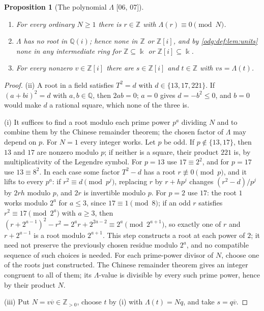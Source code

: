 \documentclass[11pt,oneside]{article}
\numberwithin{equation}{section}
\newtheorem{proposition}[proposition]{Proposition}
\theoremstyle{definition}
\theoremstyle{remark}
\newcommand{\Z}{\mathbb Z}
\newcommand{\Q}{\mathbb Q}
\newcommand{\src}[1]{\textup{\textsf{\small[#1]}}}
\begin{document}
\begin{proposition}[The polynomial $\Lambda$ \src{06, 07}]\label{odg:def:prop:intersective}
\leavevmode
\begin{enumerate}[label=\textup{(\roman*)},leftmargin=*]
\item For every ordinary $N\ge1$ there is $r\in\Z$ with
$\Lambda(r)\equiv0\pmod N$.
\item $\Lambda$ has no root in $\Q(i)$; hence none in $\Z$ or $\Z[i]$, and by
\cref{odg:def:lem:units} none in any intermediate ring for $\Z\subseteq\Bbbk$
or $\Z[i]\subseteq\Bbbk$.
\item For every nonzero $v\in\Z[i]$ there are $s\in\Z[i]$ and $t\in\Z$ with
$vs=\Lambda(t)$.
\end{enumerate}
\end{proposition}
\begin{proof}
(ii) A root in a field satisfies $T^2=d$ with $d\in\{13,17,221\}$. If
$(a+bi)^2=d$ with $a,b\in\Q$, then $2ab=0$; $a=0$ gives $d=-b^2\le0$, and
$b=0$ would make $d$ a rational square, which none of the three is.

(i) It suffices to find a root modulo each prime power $p^a$ dividing $N$
and to combine them by the Chinese remainder theorem; the chosen factor of
$\Lambda$ may depend on $p$. For $N=1$ every integer works. Let $p$ be odd. If $p\notin\{13,17\}$, then $13$
and $17$ are nonzero modulo $p$; if neither is a square, their product $221$
is, by multiplicativity of the Legendre symbol. For $p=13$ use
$17\equiv2^2$, and for $p=17$ use $13\equiv8^2$. In each case some factor
$T^2-d$ has a root $r\not\equiv0\pmod p$, and it lifts to every $p^a$: if
$r^2\equiv d\pmod{p^j}$, replacing $r$ by $r+hp^j$ changes $(r^2-d)/p^j$ by
$2rh$ modulo $p$, and $2r$ is invertible modulo $p$. For $p=2$ use $17$: the
root $1$ works modulo $2^a$ for $a\le3$, since $17\equiv1\pmod8$; if an odd
$r$ satisfies $r^2\equiv17\pmod{2^a}$ with $a\ge3$, then
$(r+2^{a-1})^2-r^2=2^ar+2^{2a-2}\equiv2^a\pmod{2^{a+1}}$, so exactly one of
$r$ and $r+2^{a-1}$ is a root modulo $2^{a+1}$. This step constructs a
root at each power of $2$; it need not preserve the previously chosen
residue modulo $2^a$, and no compatible sequence of such choices is needed.
For each prime-power divisor of $N$, choose one of the roots just
constructed. The Chinese remainder theorem gives an integer congruent to
all of them; its $\Lambda$-value is divisible by every such prime power,
hence by their product $N$.

(iii) Put $N=v\overline v\in\Z_{>0}$, choose $t$ by (i) with $\Lambda(t)=Nq$,
and take $s=q\overline v$.
\end{proof}
\end{document}
